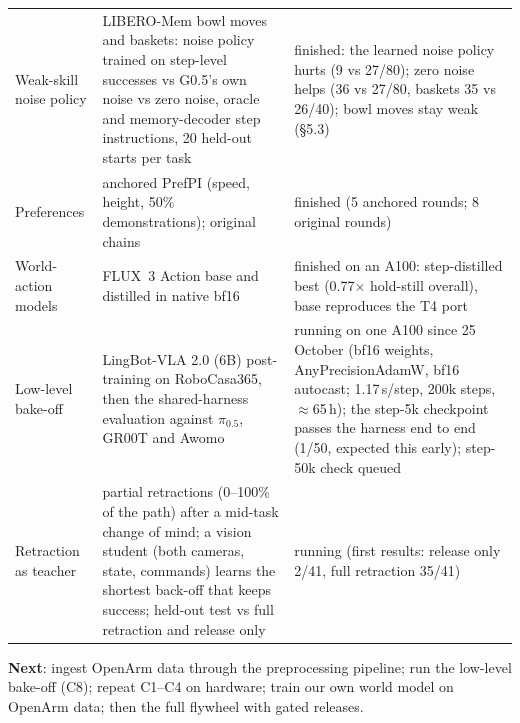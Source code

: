 \documentclass[10pt,a4paper]{article}
\newcommand{\pzf}{$\pi_{0.5}$}
\begin{document}
\begin{small}
\begin{xltabular}{\textwidth}{>{\raggedright\arraybackslash}p{3.1cm}YY}
Weak-skill noise policy & LIBERO-Mem bowl moves and baskets: noise policy trained on step-level successes vs G0.5's own noise vs zero noise, oracle and memory-decoder step instructions, 20 held-out starts per task & finished: the learned noise policy hurts (9 vs 27/80); zero noise helps (36 vs 27/80, baskets 35 vs 26/40); bowl moves stay weak (\S5.3) \\
Preferences & anchored PrefPI (speed, height, 50\% demonstrations); original chains & finished (5 anchored rounds; 8 original rounds) \\
World-action models & FLUX~3 Action base and distilled in native bf16 & finished on an A100: step-distilled best (0.77$\times$ hold-still overall), base reproduces the T4 port \\
Low-level bake-off & LingBot-VLA 2.0 (6B) post-training on RoboCasa365, then the shared-harness evaluation against \pzf, GR00T and Awomo & running on one A100 since 25 October (bf16 weights, AnyPrecisionAdamW, bf16 autocast; 1.17\,s/step, 200k steps, $\approx$65\,h); the step-5k checkpoint passes the harness end to end (1/50, expected this early); step-50k check queued \\
Retraction as teacher & partial retractions (0--100\% of the path) after a mid-task change of mind; a vision student (both cameras, state, commands) learns the shortest back-off that keeps success; held-out test vs full retraction and release only & running (first results: release only 2/41, full retraction 35/41) \\
\bottomrule
\end{xltabular}
\end{small}
\textbf{Next}: ingest OpenArm data through the preprocessing pipeline; run the low-level bake-off (C8); repeat C1--C4 on hardware; train our own world model on OpenArm data; then the full flywheel with gated releases.
\end{document}
